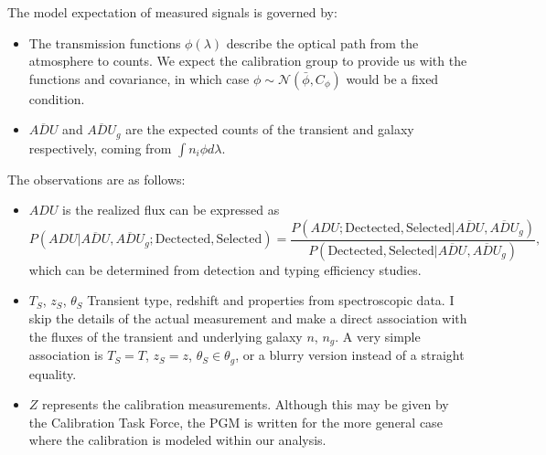 \documentclass[preprint]{aastex}
\begin{document}
The model expectation of measured  signals is governed by:
\begin{itemize}
\item The transmission functions $\phi(\lambda)$ describe the optical path from the
atmosphere to counts.  We expect
the calibration group to provide us with the functions and covariance,
in which case
$\phi \sim \mathcal{N}(\bar{\phi},C_\phi)$ would be a fixed condition.
\item $\overline{\mathit{ADU}}$ and
$\overline{\mathit{ADU}}_g$ are the expected counts of the transient and galaxy respectively,
coming from $\int n_i \phi d\lambda$.
\end{itemize}

The observations are as follows:
\begin{itemize}
\item ${\mathit{ADU}}$ is the realized flux can be expressed as
\begin{equation}
P({\mathit{ADU}} | \overline{\mathit{ADU}}, 
\overline{\mathit{ADU}}_g; \text{Dectected}, \text{Selected})=\frac{P({\mathit{ADU}};\text{Dectected}, \text{Selected} |  
\overline{\mathit{ADU}}, \overline{\mathit{ADU}}_g)}{P(\text{Dectected}, \text{Selected} | 
\overline{\mathit{ADU}},  \overline{{\mathit{ADU}}}_g)},
\end{equation}
which can be determined from detection and typing efficiency studies.
\item ${T}_S$, ${z}_S$, ${\theta}_S$ Transient type, redshift and properties from
spectroscopic data. I skip the details of the actual measurement  and make a direct association
with the fluxes of the transient and underlying galaxy $n$, $n_g$.
A very simple association is ${T}_S = T$, ${z}_S=z$, ${\theta}_S \in \theta_g$,
or a blurry version instead of a straight equality.
\item ${Z}$ represents the calibration measurements.   Although this may be given
by the Calibration Task Force, the PGM is written for the more general case where the calibration
is modeled within our analysis.
\end{itemize}
\end{document}
